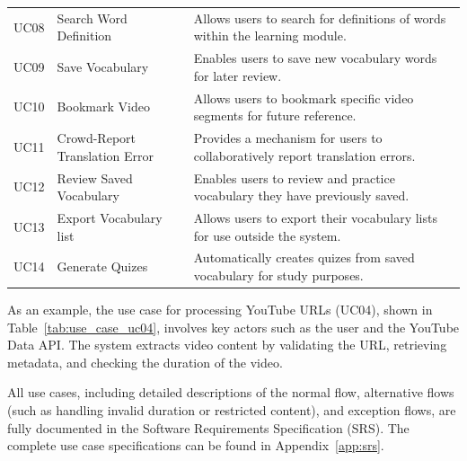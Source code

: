 \documentclass[oneside]{utmthesis}
\begin{document}
\begin{longtable}{>{\centering\arraybackslash}m{1.2cm} >{\centering\arraybackslash}m{3cm} >{\arraybackslash}m{8cm}}
    UC08        & Search Word Definition         & Allows users to search for definitions of words within the learning module.  \\
    UC09        & Save Vocabulary                & Enables users to save new vocabulary words for later review.                 \\
    UC10        & Bookmark Video                 & Allows users to bookmark specific video segments for future reference.       \\
    UC11        & Crowd-Report Translation Error & Provides a mechanism for users to collaboratively report translation errors. \\
    UC12        & Review Saved Vocabulary        & Enables users to review and practice vocabulary they have previously saved.  \\
    UC13        & Export Vocabulary list         & Allows users to export their vocabulary lists for use outside the system.    \\
    UC14        & Generate Quizes                & Automatically creates quizes from saved vocabulary for study purposes.       \\
\end{longtable}

As an example, the use case for processing YouTube URLs (UC04), shown in Table~\ref{tab:use_case_uc04}, involves key actors such as the user and the YouTube Data API. The system extracts video content by validating the URL, retrieving metadata, and checking the duration of the video.

All use cases, including detailed descriptions of the normal flow, alternative flows (such as handling invalid duration or restricted content), and exception flows, are fully documented in the Software Requirements Specification (SRS). The complete use case specifications can be found in Appendix~\ref{app:srs}.
\end{document}
